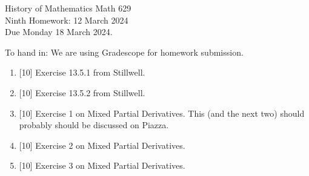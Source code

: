 \documentclass[12pt]{article}
\begin{document}
\LARGE 
\noindent
{\color{Maroon}History of Mathematics \hfill Math 629}\vspace{2pt}\\
\large
Ninth Homework: \hfill 12 March 2024\\
Due Monday 18 March 2024.
\normalsize\vspace{10pt}

To hand in: We are using Gradescope for homework submission.


\begin{enumerate}

\item  {[10]}
     Exercise 13.5.1 from Stillwell.

\item  {[10]}
     Exercise 13.5.2 from Stillwell.

\item  {[10]}
  Exercise 1 on Mixed Partial Derivatives.
  This (and the next two) should probably should be discussed on Piazza.

\item  {[10]}
       Exercise 2 on Mixed Partial Derivatives.

\item  {[10]}
       Exercise 3 on Mixed Partial Derivatives.


 \end{enumerate}
\end{document}
